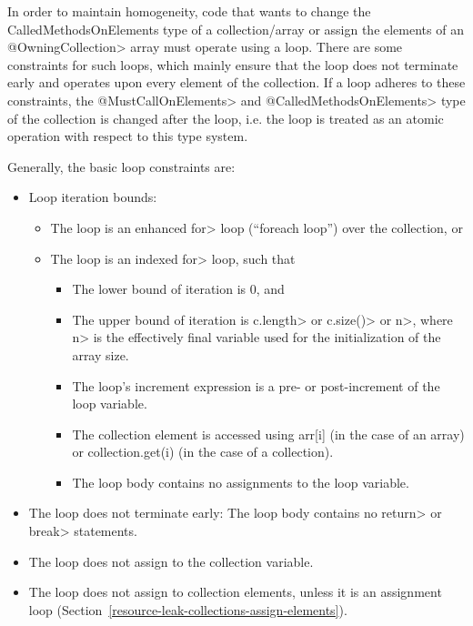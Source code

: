 
In order to maintain homogeneity, code that wants to change the CalledMethodsOnElements type of a collection/array or assign the elements of an \<@OwningCollection> array must operate using a loop. There are some constraints for such loops, which mainly ensure that the loop does not terminate early and operates upon every element of the collection. If a loop adheres to these constraints, the \<@MustCallOnElements> and \<@CalledMethodsOnElements> type of the collection is changed after the loop, i.e. the loop is treated as an atomic operation with respect to this type system.

Generally, the basic loop constraints are:
\begin{itemize}
\item Loop iteration bounds:
  \begin{itemize}
  \item
    The loop is an enhanced \<for> loop (``foreach loop'') over the collection, or
  \item
    The loop is an indexed \<for> loop, such that
    \begin{itemize}
    \item The lower bound of iteration is 0, and
    \item The upper bound of iteration is \<c.length> or \<c.size()> or \<n>,
      where \<n> is the effectively final variable used for the initialization of
      the array size.
    \item The loop's increment expression is a pre- or post-increment of the
            loop variable.
    \item The collection element is accessed using arr[i] (in the case of an array) or collection.get(i) (in the case of a collection).
    \item The loop body contains no assignments to the loop variable.
    \end{itemize}
  \end{itemize}
\item The loop does not terminate early: The loop body contains no \<return> or \<break> statements.
\item The loop does not assign to the collection variable.
\item The loop does not assign to collection elements, unless it is an
  assignment loop (Section~\ref{resource-leak-collections-assign-elements}).
\end{itemize}

